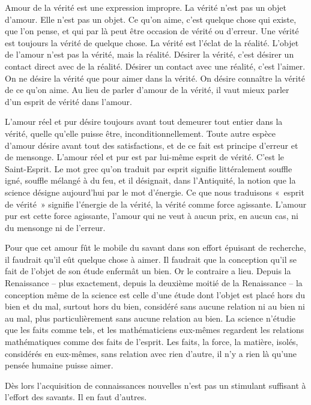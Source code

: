 \documentclass[french,twoside]{book} %
\begin{document}
Amour de la vérité est une expression impropre. La vérité n'est pas un objet d'amour. Elle n'est pas un objet. Ce qu'on aime, c'est quelque chose qui existe, que l'on pense, et qui par là peut être occasion de vérité ou d'erreur. Une vérité est toujours la vérité de quelque chose. La vérité est l'éclat de la réalité. L'objet de l'amour n'est pas la vérité, mais la réalité. Désirer la vérité, c'est désirer un contact direct avec de la réalité. Désirer un contact avec une réalité, c'est l'aimer. On ne désire la vérité que pour aimer dans la vérité. On désire connaître la vérité de ce qu'on aime. Au lieu de parler d'amour de la vérité, il vaut mieux parler d'un esprit de vérité dans l'amour.\par
L'amour réel et pur désire toujours avant tout demeurer tout entier dans la vérité, quelle qu'elle puisse être, inconditionnellement. Toute autre espèce d'amour désire avant tout des satisfactions, et de ce fait est principe d'erreur et de mensonge. L'amour réel et pur est par lui-même esprit de vérité. C'est le Saint-Esprit. Le mot grec qu'on traduit par esprit signifie littéralement souffle igné, souffle mélangé à du feu, et il désignait, dans l'Antiquité, la notion que la science désigne aujourd'hui par le mot d'énergie. Ce que nous traduisons « esprit de vérité » signifie l'énergie de la vérité, la vérité comme force agissante. L'amour pur est cette force agissante, l'amour qui ne veut à aucun prix, en aucun cas, ni du mensonge ni de l'erreur.\par
Pour que cet amour fût le mobile du savant dans son effort épuisant de recherche, il faudrait qu'il eût quelque chose à aimer. Il faudrait que la conception qu'il se fait de l'objet de son étude enfermât un bien. Or le contraire a lieu. Depuis la Renaissance – plus exactement, depuis la deuxième moitié de la Renaissance – la conception même de la science est celle d'une étude dont l'objet est placé hors du bien et du mal, surtout hors du bien, considéré sans aucune relation ni au bien ni au mal, plus particulièrement sans aucune relation au bien. La science n'étudie que les faits comme tels, et les mathématiciens eux-mêmes regardent les relations mathématiques comme des faits de l’esprit. Les faits, la force, la matière, isolés, considérés en eux-mêmes, sans relation avec rien d'autre, il n'y a rien là qu'une pensée humaine puisse aimer.\par
Dès lors l'acquisition de connaissances nouvelles n'est pas un stimulant suffisant à l'effort des savants. Il en faut d'autres.\par
\end{document}
